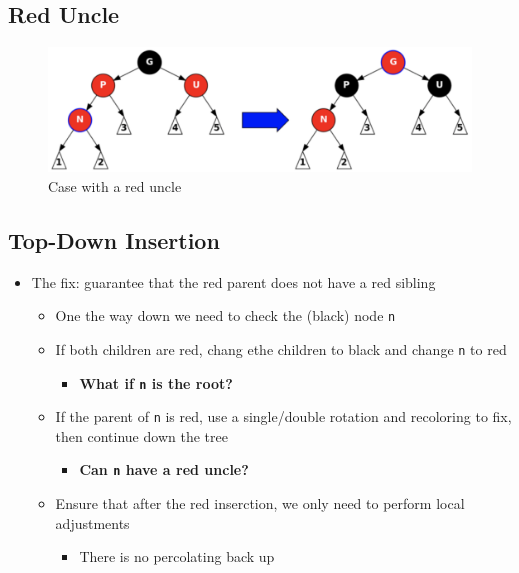 \documentclass[
  10pt,
  english,
  letterpaper,
,tablecaptionabove
]{scrartcl}
\newcommand{\passthrough}[1]{#1}
\providecommand{\tightlist}{%
  \setlength{\itemsep}{0pt}\setlength{\parskip}{0pt}}
\begin{document}
\hypertarget{red-uncle}{%
\subsection{Red Uncle}\label{red-uncle}}

\begin{figure}
\centering
\includegraphics[width=1\textwidth,height=\textheight]{images/6.png}
\caption{Case with a red uncle}
\end{figure}

\hypertarget{top-down-insertion}{%
\subsection{Top-Down Insertion}\label{top-down-insertion}}

\begin{itemize}
\tightlist
\item
  The fix: guarantee that the red parent does not have a red sibling

  \begin{itemize}
  \tightlist
  \item
    One the way down we need to check the (black) node
    \passthrough{\lstinline!n!}
  \item
    If both children are red, chang ethe children to black and change
    \passthrough{\lstinline!n!} to red

    \begin{itemize}
    \tightlist
    \item
      \textbf{What if \passthrough{\lstinline!n!} is the root?}
    \end{itemize}
  \item
    If the parent of \passthrough{\lstinline!n!} is red, use a
    single/double rotation and recoloring to fix, then continue down the
    tree

    \begin{itemize}
    \tightlist
    \item
      \textbf{Can \passthrough{\lstinline!n!} have a red uncle?}
    \end{itemize}
  \item
    Ensure that after the red inserction, we only need to perform local
    adjustments

    \begin{itemize}
    \tightlist
    \item
      There is no percolating back up
    \end{itemize}
  \end{itemize}
\end{itemize}
\end{document}
